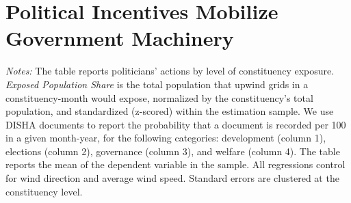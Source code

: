 \documentclass[12pt]{article}
\let\SourceInput
\renewcommand{}[1]{%
  \IfFileExists{../../#1}{\SourceInput{../../#1}}{%
    \IfFileExists{../../#1.tex}{\SourceInput{../../#1.tex}}{%
      \fbox{\scriptsize Missing table: \detokenize{#1}}}}}
\begin{document}

\FloatBarrier
\section{Political Incentives Mobilize Government Machinery}
\begin{table}[htbp]
    \centering
    \caption{Pollution Exposure and Politicians' Actions, all categories}
    \label{tab:court_disha_app}
    \resizebox{\textwidth}{!}{
    
    }
    \begin{minipage}{\textwidth}
        {\small \textit{Notes:}  The table reports politicians' actions by level of constituency exposure. 
        \textit{Exposed Population Share}  is the total population that upwind grids in a constituency-month would expose, normalized by the constituency's total population, and standardized (z-scored) within the estimation sample.
        We use DISHA documents to report the probability that a document is recorded per 100 in a given month-year, for the following categories: development (column 1), elections (column 2), governance (column 3), and welfare (column 4).
        The table reports the mean of the dependent variable in the sample. All regressions control for wind direction and average wind speed. Standard errors are clustered at the constituency level.  }
    \end{minipage}
\end{table}

 
 
 
\end{document}
